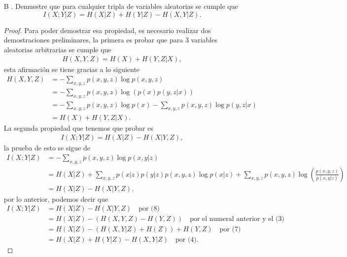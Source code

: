\begin{enumerate}
\begin{proof}
\end{proof}

    \item[B]. Demuestre que para cualquier tripla de variables aleatorias se cumple que 
    \[
    I(X; Y | Z) = H(X | Z) + H(Y | Z) - H(X, Y | Z).
    \]
    \begin{proof}
    Para poder demostrar esa propiedad, es necesario realizar dos demostraciones preliminares, la primera es probar que para 3 variables aleatorias arbitrarias se cumple que
    \begin{align}
        H(X,Y,Z)=H(X)+H(Y,Z|X)
    ,\end{align}
    esta afirmación se tiene gracias a lo siguiente 
    \begin{align*}
        H(X,Y,Z) &= - \sum_{x,y,z} p(x,y,z) \log p(x,y,z)\\
&= - \sum_{x,y,z} p(x,y,z) \log \left( p(x) p(y,z|x) \right)\\
&= - \sum_{x,y,z} p(x,y,z) \log p(x) - \sum_{x,y,z} p(x,y,z) \log p(y,z|x)\\
&= H(X) + H(Y,Z|X)
    .\end{align*}
La segunda propiedad que tenemos que probar es 
\begin{align}
    I(X;Y |Z) = H(X|Z)-H(X|Y,Z)
,\end{align}
la prueba de esto se sigue de
\begin{align*}
    I(X;Y | Z) &= - \sum_{x,y,z} p(x,y,z) \log p(x,y|z)\\
&= H(X|Z) + \sum_{x,y,z} p(x|z) p(y|z) p(x,y,z) \log p(x|z) + \sum_{x,y,z} p(x,y,z) \log \left( \frac{p(x,y,z)}{p(x,y|z)} \right)\\
&= H(X|Z) - H(X|Y,Z)
.\end{align*}
por lo anterior, podemos decir que 
    \begin{align*}
        I(X;Y | Z) &= H(X | Z) - H(X | Y, Z)\quad \text{por (8)}\\
&= H(X | Z) - \left( H(X, Y, Z) - H(Y, Z) \right) \quad \text{por el numeral anterior y el (3)}\\
&= H(X | Z) - \left( H(X, Y | Z) + H(Z) \right) + H(Y, Z) \quad \text{por (7)}\\
&= H(X | Z) + H(Y | Z) - H(X, Y | Z) \quad \text{por (4)}
    .\end{align*}
\end{proof}


\end{enumerate}
